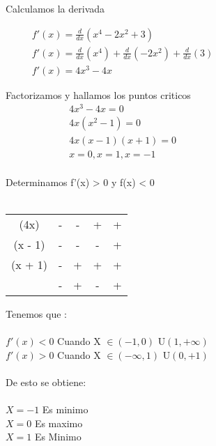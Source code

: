 \documentclass{report}
\begin{document}
{\Large\justify
Calculamos la derivada 

\begin{align*}
     &f'(x) = \frac{d}{dx}\left(x^4 -2x^2 +3\right)&&&&&&&&&&&&&&&&\\
     &f'(x) = \frac{d}{dx}\left(x^4 \right) + \frac{d}{dx}\left(-2x^2\right)+ \frac{d}{dx}\left(3\right)\\
     &f'(x) = 4x^3 -4x  
\end{align*}
 
Factorizamos  y hallamos los puntos criticos
\begin{align*}
     &  4x^3 -4x = 0 &&&&&&&&&&&&&&&&\\
     & 4x(x^2 -1) = 0 \\
     & 4x(x - 1)(x + 1) = 0\\
     & x = 0 , x = 1 ,  x = -1&\\
\end{align*}

Determinamos f'(x) > 0 y f(x) < 0\\\\
\begin{tabular}{c c c c c }
     (4x)    & - & - & + & + \\ 
     (x - 1) & - & - & - & +\\
     (x + 1) & - & + & + & + \\
             & - & + & - & +
\end{tabular}

Tenemos que :\\\\
$ f'(x) < 0 $ Cuando X $ \in  \left(-1,0\right) $ U$ \left(1,+\infty\right)$\\
$ f'(x) > 0 $ Cuando X $ \in  \left(-\infty,1\right) $ U$ \left(0,+1\right)$\\
\\De esto se obtiene:\\\\
$X = -1  $ Es minimo\\
$X =  0  $ Es maximo\\
$X =  1  $ Es Minimo\\

}
\end{document}
